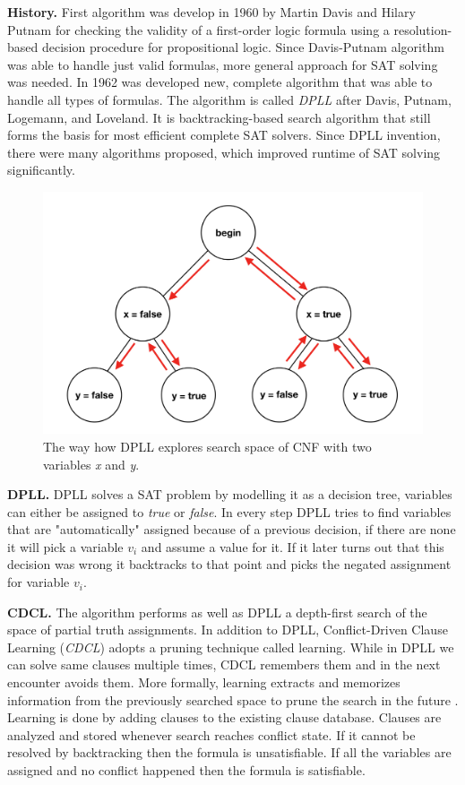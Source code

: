 \documentclass[letterpaper]{article}
\newcommand{\mypar}[1]{{\bf #1.}}
\begin{document}
\mypar{History} First algorithm was develop in 1960 by Martin Davis and Hilary Putnam \cite{dp} for checking the validity of a first-order logic formula using a resolution-based decision procedure for propositional logic. Since Davis-Putnam algorithm was able to handle just valid formulas, more general approach for SAT solving was needed. In 1962 was developed new, complete algorithm that was able to handle all types of formulas. The algorithm is called \textit{DPLL} \cite{dpll} after Davis, Putnam, Logemann, and Loveland. It is backtracking-based search algorithm that still forms the basis for most efficient complete SAT solvers. Since DPLL invention, there were many algorithms proposed, which improved runtime of SAT solving significantly.
\begin{figure}
	\centering
	\includegraphics[width=\columnwidth]{figures/dpll-branching}
	\caption{The way how DPLL explores search space of CNF with two variables \textit{x} and \textit{y}.
		\label{fig:dpll-branching}}
\end{figure}

\mypar{DPLL} DPLL solves a SAT problem by modelling it as a decision tree, variables can either be assigned to \textit{true} or \textit{false}. In every step DPLL tries to find variables that are "automatically" assigned because of a previous decision,
if there are none it will pick a variable $v_i$ and assume a value for it.
If it later turns out that this decision was wrong it backtracks to that point and picks the negated assignment for variable $v_i$.

\mypar{CDCL} The algorithm performs as well as DPLL a depth-first search of the space of partial truth assignments. In addition to DPLL, Conflict-Driven Clause Learning (\textit{CDCL}) adopts a pruning technique called learning. While in DPLL we can solve same clauses multiple times, CDCL remembers them and in the next encounter avoids them. More formally, learning extracts and memorizes information from the previously searched space to prune the search in the future \cite{cdcl}. Learning is done by adding clauses to the existing clause database. Clauses are analyzed and stored whenever search reaches conflict state. If it cannot be resolved by backtracking then the formula is unsatisfiable. If all the variables are assigned and no conflict happened then the formula is satisfiable. \cite{hordesat}
\end{document}
